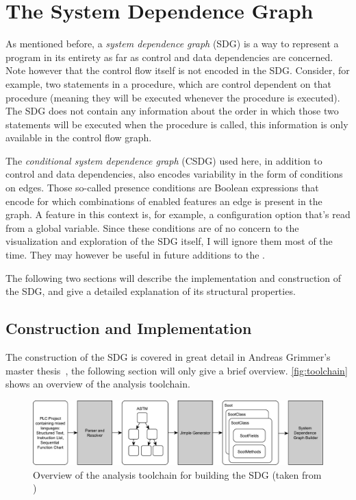 \chapter{The System Dependence Graph} \label{ch:sdg}

As mentioned before, a \emph{system dependence graph} (SDG) is a way to represent a program in its entirety as far as 
control and data dependencies are concerned. Note however that the control flow itself is not encoded in the SDG. 
Consider, for example, two statements in a procedure, which are control dependent on that procedure (meaning they will 
be executed whenever the procedure is executed). The SDG does not contain any information about the order in which 
those two statements will be executed when the procedure is called, this information is only available in the control 
flow graph.

The \emph{conditional system dependence graph} (CSDG) used here, in addition to control and data dependencies, also 
encodes variability in the form of conditions on edges. Those so-called presence conditions are Boolean expressions 
that encode for which combinations of enabled features an edge is present in the graph. A feature in this context is, 
for example, a configuration option that's read from a global variable. Since these conditions are of no concern to the 
visualization and exploration of the SDG itself, I will ignore them most of the time. They may however be useful in 
future additions to the \SB.

The following two sections will describe the implementation and construction of the SDG, and give a detailed 
explanation of its structural properties.


\section{Construction and Implementation}

The construction of the SDG is covered in great detail in Andreas Grimmer's master thesis~\cite{GrimmerDA}, the 
following section will only give a brief overview. \autoref{fig:toolchain} shows an overview of the analysis toolchain.

\begin{figure}[ht]
  \centering
    \includegraphics[width=\textwidth]{bilder/toolchain}
  \caption{Overview of the analysis toolchain for building the SDG (taken from \cite{GrimmerDA})}
  \label{fig:toolchain}
\end{figure}

